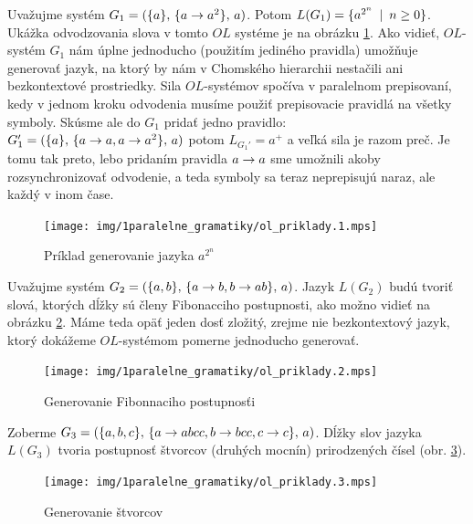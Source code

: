 \begin{priklad}
  Uvažujme systém $G_1=(\{a\},\,\{a \rightarrow a^2\},\,a)$.
  Potom $L(G_1)=\{a^{2^n} \enspace |\enspace n \ge 0\}$.
  Ukážka odvodzovania slova v tomto $OL$ systéme je na obrázku 
  \ref{img:ol_priklad_1}.
  Ako vidieť, $OL$-systém $G_1$ nám úplne jednoducho 
  (použitím jediného pravidla) umožňuje
  generovať jazyk, na ktorý by nám v Chomského hierarchii
  nestačili ani bezkontextové prostriedky.
  Sila $OL$-systémov spočíva v paralelnom prepisovaní,
  kedy v jednom kroku odvodenia
  musíme použiť prepisovacie pravidlá na všetky symboly.
  Skúsme ale do $G_1$ pridať jedno pravidlo:\\
  $G_{1}'=(\{a\},\,\{a \rightarrow a, a \rightarrow a^2\},\,a)$
  potom $L_{G_1'}=a^{+}$ a veľká sila je razom
  preč. Je tomu tak preto, lebo pridaním pravidla $a\rightarrow a$ sme
  umožnili akoby rozsynchronizovať odvodenie, a teda symboly sa
  teraz neprepisujú naraz, ale každý v inom čase.

  \begin{figure}[htp]
    \centering
    \texttt{[image: img/1paralelne\_gramatiky/ol\_priklady.1.mps]}
    \caption{Príklad generovanie jazyka $a^{2^n}$}
    \label{img:ol_priklad_1}
  \end{figure}
\end{priklad}


\begin{priklad}
  Uvažujme systém
  $G_{2}=(\{a,b\},\,\{a \rightarrow b, b \rightarrow ab\},\,a)$.
  Jazyk $L(G_{2})$ budú
  tvoriť slová, ktorých dĺžky sú členy Fibonacciho postupnosti, ako
  možno vidieť na obrázku \ref{img:ol_priklad_2}. Máme teda
  opäť jeden dosť zložitý, zrejme nie bezkontextový jazyk,
  ktorý dokážeme $OL$-systémom pomerne jednoducho generovať.
  \begin{figure}[htp]
    \centering
    \texttt{[image: img/1paralelne\_gramatiky/ol\_priklady.2.mps]}
    \caption{Generovanie Fibonnaciho postupnosťi}
    \label{img:ol_priklad_2}
  \end{figure}
\end{priklad}


\begin{priklad}
  Zoberme $G_3=(\{a,b,c\},\,
    \{a \rightarrow abcc,b \rightarrow bcc, c \rightarrow c\},\,a)$.
  Dĺžky slov jazyka $L(G_3)$ tvoria postupnosť štvorcov (druhých mocnín)
  prirodzených čísel (obr. \ref{img:ol_priklad_3}).

  \begin{figure}[htp]
    \centering
    \texttt{[image: img/1paralelne\_gramatiky/ol\_priklady.3.mps]}
    \caption{Generovanie štvorcov}
    \label{img:ol_priklad_3}
  \end{figure}
\end{priklad}

